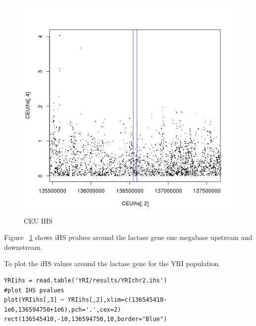 \begin{figure}
\centering
\includegraphics{pictures/CEUihs.png}
\caption{CEU IHS}
\label{fig:ceuihs}
\end{figure}

Figure ~\ref{fig:ceuihs} shows iHS pvalues around the lactase gene one megabase upstream and downstream.

To plot the iHS values around the lactase gene for the YRI population.\\
\begin{verbatim}
YRIihs = read.table('YRI/results/YRIchr2.ihs')
#plot IHS pvalues
plot(YRIihs[,3] ~ YRIihs[,2],xlim=c(136545410-1e6,136594750+1e6),pch='.',cex=2)
rect(136545410,-10,136594750,10,border="Blue") 
\end{verbatim}

